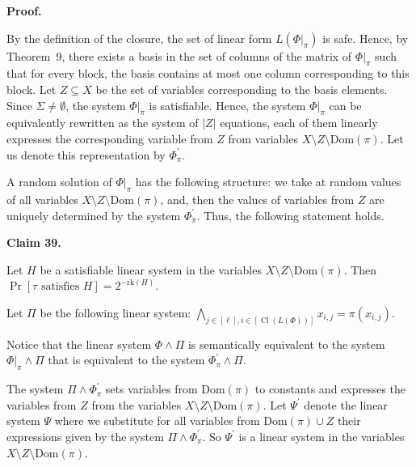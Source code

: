 \par\medskip\noindent\textbf{Proof.}\par


By the definition of the closure, the set of linear form
$L(\Phi|_{\pi})$ is safe. Hence, by Theorem 9, there exists a basis in the set of columns of the matrix of $\Phi|_{\pi}$ such that for every block, the basis contains at most one column corresponding to this block. Let $Z\subseteq X$ be the set of variables corresponding to the basis elements. Since $\Sigma\neq\emptyset$, the system $\Phi|_{\pi}$ is satisfiable.
Hence, the system $\Phi|_{\pi}$ can be equivalently rewritten as the system of $|Z|$ equations, each of them linearly expresses the corresponding variable from $Z$ from variables $X\setminus Z\setminus\mathrm{Dom}(\pi)$. Let us denote this representation by $\Phi_{\pi}^{\prime}$.\par



A random solution of $\Phi|_{\pi}$ has the following structure: we take at random values of all variables $X\setminus Z\setminus\mathrm{Dom}(\pi)$, and, then the values of
variables from $Z$ are uniquely determined by the system $\Phi_{\pi}^{\prime}$. Thus, the following statement holds.\par



\par\medskip\noindent\textbf{
Claim 39. 
}\par



Let $H$ be a satisfiable linear system in the variables $X\setminus Z\setminus\mathrm{Dom}(\pi)$. Then $\Pr[\tau\mbox{ satisfies }H]=2^{-\mathrm{rk}(H)}$.\par




Let $\Pi$ be the following linear system:
$\bigwedge_{j\in[\ell],i\in[\mathop{\mathrm{Cl}}(L(\Phi))]}x_{i,j}=\pi(x_{i,j})$.\par



Notice that the linear system $\Phi\land\Pi$ is semantically equivalent to the system $\Phi|_{\pi}\land\Pi$ that is equivalent to the system $\Phi^{\prime}_{\pi}\land\Pi$.\par



The system $\Pi\land\Phi_{\pi}^{\prime}$ sets variables from $\mathrm{Dom}(\pi)$ to constants and expresses the variables from $Z$ from the variables $X\setminus Z\setminus\mathrm{Dom}(\pi)$. Let $\Psi^{\prime}$ denote the linear system $\Psi$ where we
substitute for all variables from $\mathrm{Dom}(\pi)\cup Z$ their expressions given by the system $\Pi\land\Phi_{\pi}^{\prime}$. So $\Psi^{\prime}$ is a linear system in the variables $X\setminus Z\setminus\mathrm{Dom}(\pi)$.\par



